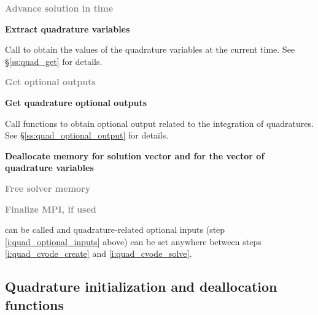 \begin{Steps}
\item\label{i:quad_cvode_solve}
  \textcolor{gray}{\bf Advance solution in time}

\item
  {\bf Extract quadrature variables}

  Call  to obtain the values of the quadrature variables at
  the current time. See \S\ref{ss:quad_get} for details.

\item
  \textcolor{gray}{\bf Get optional outputs}

\item
  {\bf Get quadrature optional outputs}

  Call  functions to obtain optional output related to
  the integration of quadratures.
  See \S\ref{ss:quad_optional_output} for details.

\item
  {\bf Deallocate memory for solution vector and for the vector of quadrature variables}
  
\item
  \textcolor{gray}{\bf Free solver memory}

\item 
  \textcolor{gray}{\bf Finalize MPI, if used}
  
\end{Steps}
 can be called and quadrature-related optional inputs 
(step \ref{i:quad_optional_inputs} above) can be set anywhere between steps 
\ref{i:quad_cvode_create} and \ref{i:quad_cvode_solve}.


\subsection{Quadrature initialization and deallocation functions}\label{ss:quad_malloc}

